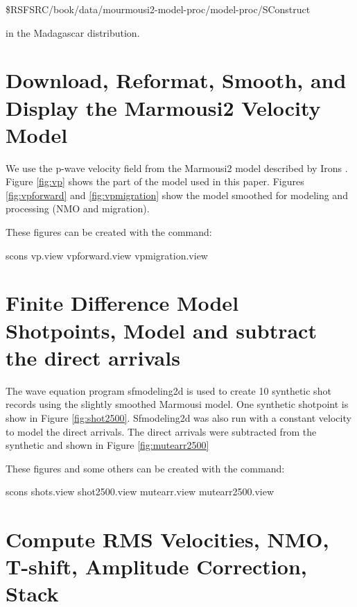  \$RSFSRC/book/data/mourmousi2-model-proc/model-proc/SConstruct 

in the Madagascar distribution.

\section{Download, Reformat, Smooth, and Display the Marmousi2 Velocity Model}
We use the p-wave velocity field from the Marmousi2 model described by Irons 
\cite[]{irons}.  Figure \ref{fig:vp} shows the part of the model used in this 
paper.  Figures \ref{fig:vpforward} and \ref{fig:vpmigration} show the model 
smoothed for modeling and processing (NMO and migration). 

These figures can be created with the command:

scons vp.view vpforward.view vpmigration.view


\section{Finite Difference Model Shotpoints, Model and subtract the direct arrivals}

The wave equation program sfmodeling2d \cite[]{Yang} is used to create 10 
synthetic shot records using the slightly smoothed Marmousi model.   One 
synthetic shotpoint is show in Figure \ref{fig:shot2500}. Sfmodeling2d was also
run with a constant velocity to model the direct arrivals.  The direct arrivals
were subtracted from the synthetic and shown in Figure 
\ref{fig:mutearr2500} 

These figures and some others can be created with the command:

scons shots.view shot2500.view mutearr.view mutearr2500.view


\section{Compute RMS Velocities, NMO, T-shift, Amplitude Correction, Stack}

